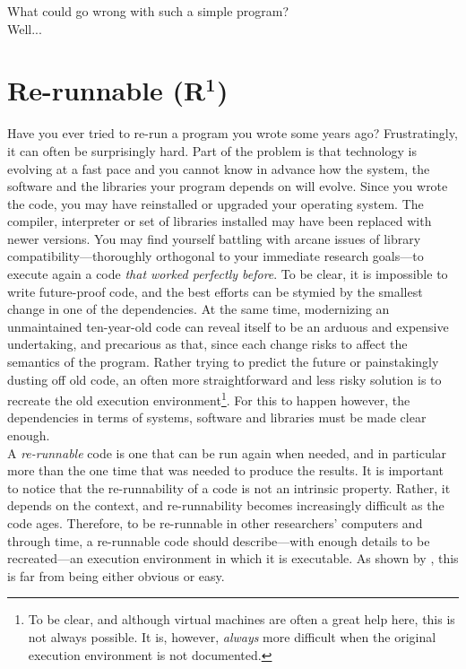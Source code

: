 \documentclass[a4paper,11pt]{article}
\begin{document}
What could go wrong with such a simple program?\\
\vfill
Well...
\vfill


\clearpage
\section*{Re-runnable (R$^{\mathbf 1}$)}

Have you ever tried to re-run a program you wrote some years ago? Frustratingly, it can often be surprisingly hard. Part of the problem is that technology is evolving at a fast pace and you cannot know in advance how the system, the software and the libraries your program depends on will evolve. Since you wrote the code, you may have reinstalled or upgraded  your operating system. The compiler, interpreter or set of libraries installed may have been replaced with newer versions. You may find yourself battling with arcane issues of library compatibility---thoroughly orthogonal to your immediate research  goals---to execute again a code \emph{that worked perfectly before}. To be clear, it is impossible to write future-proof code, and the best efforts can be stymied by the smallest change in one of the dependencies. At the same time, modernizing an unmaintained ten-year-old code can reveal itself to be an arduous and expensive undertaking, and precarious as that, since each change risks to affect the semantics of the program. Rather trying to predict the future or painstakingly dusting off old code, an often more straightforward and less risky solution is to recreate the old execution environment\footnote{To be clear, and although virtual machines are often a great help here, this is not always possible. It is, however, \emph{always} more difficult when the original execution environment is not documented.}. For this to happen however, the dependencies in terms of systems, software and libraries must be made clear enough.\\

A \emph{re-runnable} code is one that can be run again when needed, and in particular more than the one time that was needed to produce the results. It is important to notice that the re-runnability of a code is not an intrinsic property. Rather, it depends on the context, and re-runnability becomes increasingly difficult as the code ages. Therefore, to be re-runnable in other researchers' computers and through time, a re-runnable code should describe---with enough details to be recreated---an execution environment in which it is executable. As shown by \citep{Collberg:2016}, this is far from being either obvious or easy.\\
\end{document}
